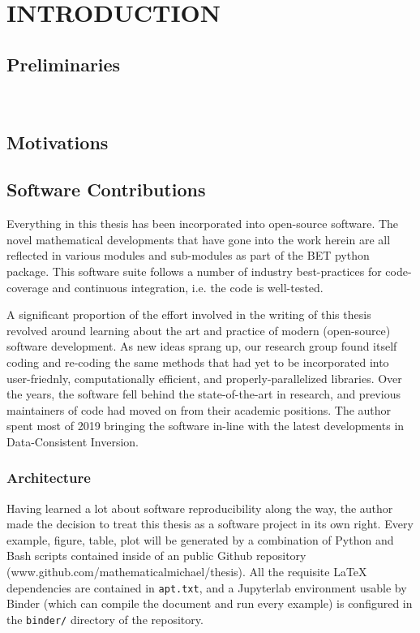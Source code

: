 \chapter{\uppercase{Introduction}} \label{chapter:01}

\section{Preliminaries}

\
\section{Motivations}


\section{Software Contributions}
Everything in this thesis has been incorporated into open-source software.
The novel mathematical developments that have gone into the work herein are all reflected in various modules and sub-modules as part of the BET python package.
This software suite follows a number of industry best-practices for code-coverage and continuous integration, i.e. the code is well-tested.

A significant proportion of the effort involved in the writing of this thesis revolved around learning about the art and practice of modern (open-source) software development.
As new ideas sprang up, our research group found itself coding and re-coding the same methods that had yet to be incorporated into user-friednly, computationally efficient, and properly-parallelized libraries.
Over the years, the software fell behind the state-of-the-art in research, and previous maintainers of code had moved on from their academic positions.
The author spent most of 2019 bringing the software in-line with the latest developments in Data-Consistent Inversion.

\subsection{Architecture}
Having learned a lot about software reproducibility along the way, the author made the decision to treat this thesis as a software project in its own right.
Every example, figure, table, plot will be generated by a combination of Python and Bash scripts contained inside of an public Github repository (www.github.com/mathematicalmichael/thesis).
All the requisite LaTeX dependencies are contained in {\tt apt.txt}, and a Jupyterlab environment usable by Binder (which can compile the document and run every example) is configured in the {\tt binder/} directory of the repository.

